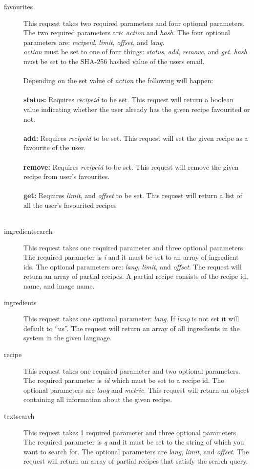 \begin{description}
\item[favourites] This request takes two required parameters and four optional parameters. The two required parameters are: \textit{action} and \textit{hash}. The four optional parameters are: \textit{recipeid}, \textit{limit}, \textit{offset}, and \textit{lang}.\\
  \textit{action} must be set to one of four things: \textit{status}, \textit{add}, \textit{remove}, and \textit{get}. \textit{hash} must be set to the SHA-256 hashed value of the users email.\\\\
  Depending on the set value of \textit{action} the following will happen:\\\\
  \textbf{status:} Requires \textit{recipeid} to be set. This request will return a boolean value indicating whether the user already has the given recipe favourited or not.\\\\
  \textbf{add:} Requires \textit{recipeid} to be set. This request will set the given recipe as a favourite of the user.\\\\
  \textbf{remove:} Requires \textit{recipeid} to be set. This request will remove the given recipe from user's favourites.\\\\
  \textbf{get:} Requires \textit{limit}, and \textit{offset} to be set. This request will return a list of all the user's favourited recipes\\\\
\item[ingredientsearch] This request takes one required parameter and three optional parameters. The required parameter is \textit{i} and it must be set to an array of ingredient ids. The optional parameters are: \textit{lang}, \textit{limit}, and \textit{offset}. The request will return an array of partial recipes. A partial recipe consists of the recipe id, name, and image name.
\item[ingredients] This request takes one optional parameter: \textit{lang}. If \textit{lang} is not set it will default to ``us''. The request will return an array of all ingredients in the system in the given language.
\item[recipe] This request takes one required parameter and two optional parameters. The required parameter is \textit{id} which must be set to a recipe id. The optional parameters are \textit{lang} and \textit{metric}. This request will return an object containing all information about the given recipe.
\item[textsearch] This request takes 1 required parameter and three optional parameters. The required parameter is \textit{q} and it must be set to the string of which you want to search for. The optional parameters are \textit{lang}, \textit{limit}, and \textit{offset}. The request will return an array of partial recipes that satisfy the search query.
\end{description}



